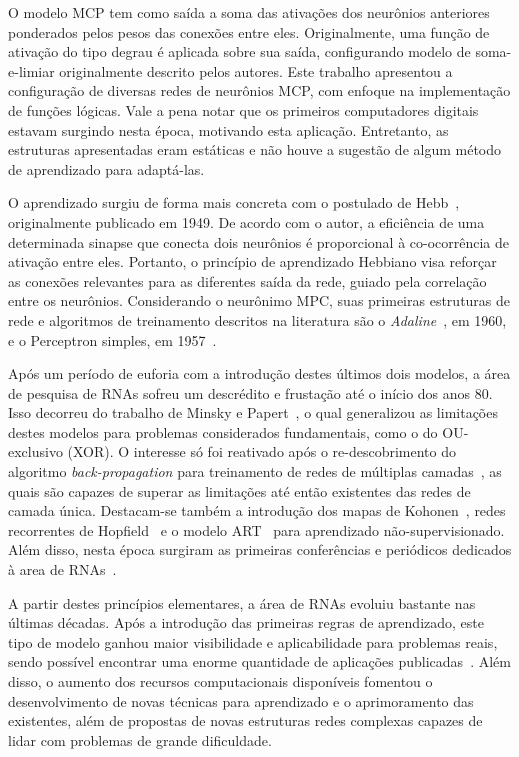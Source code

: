 \documentclass[conference]{IEEEtran}
\begin{document}
	O modelo MCP tem como saída a soma das ativações dos neurônios anteriores ponderados pelos pesos das conexões entre eles. Originalmente, uma função de ativação do tipo degrau é aplicada sobre sua saída, configurando modelo de soma-e-limiar originalmente descrito pelos autores. Este trabalho apresentou a configuração de diversas redes de neurônios MCP, com enfoque na implementação de funções lógicas. Vale a pena notar que os primeiros computadores digitais estavam surgindo nesta época, motivando esta aplicação. Entretanto, as estruturas apresentadas eram estáticas e não houve a sugestão de algum método de aprendizado para adaptá-las.
	
	O aprendizado surgiu de forma mais concreta com o postulado de Hebb~\cite{hebb2005organization}, originalmente publicado em 1949. De acordo com o autor, a eficiência de uma determinada sinapse que conecta dois neurônios é proporcional à co-ocorrência de ativação entre eles. Portanto, o princípio de aprendizado Hebbiano visa reforçar as conexões relevantes para as diferentes saída da rede, guiado pela correlação entre os neurônios. Considerando o neurônimo MPC, suas primeiras estruturas de rede e algoritmos de treinamento descritos na literatura são o \textit{Adaline}~\cite{widrow1960adaptive}, em 1960, e o Perceptron simples, em 1957~\cite{rosenblatt1957perceptron}.
	
	Após um período de euforia com a introdução destes últimos dois modelos, a área de pesquisa de RNAs sofreu um descrédito e frustação até o início dos anos 80. Isso decorreu  do trabalho de Minsky e Papert~\cite{minsky1969introduction}, o qual generalizou as limitações destes modelos para problemas considerados fundamentais, como o do OU-exclusivo (XOR). O interesse só foi reativado após o re-descobrimento do algoritmo \textit{back-propagation} para treinamento de redes de múltiplas camadas~\cite{rumelhart1985learning}, as quais são capazes de superar as limitações até então existentes das redes de camada única. Destacam-se também a introdução dos mapas de Kohonen~\cite{kohonen1982self}, redes recorrentes de Hopfield~\cite{hopfield1982neural} e o modelo ART~\cite{carpenter1987massively} para aprendizado não-supervisionado. Além disso, nesta época surgiram as primeiras conferências e periódicos dedicados à area de RNAs~\cite{macukow2016neural}.
	
	A partir destes princípios elementares, a área de RNAs evoluiu bastante nas últimas décadas. Após a introdução das primeiras regras de aprendizado, este tipo de modelo ganhou maior visibilidade e aplicabilidade para problemas reais, sendo possível encontrar uma enorme quantidade de aplicações publicadas~\cite{abiodun2018state}. Além disso, o aumento dos recursos computacionais disponíveis fomentou o desenvolvimento de novas técnicas para aprendizado e o aprimoramento das existentes, além de propostas de novas estruturas redes complexas capazes de lidar com problemas de grande dificuldade.
	
\end{document}
